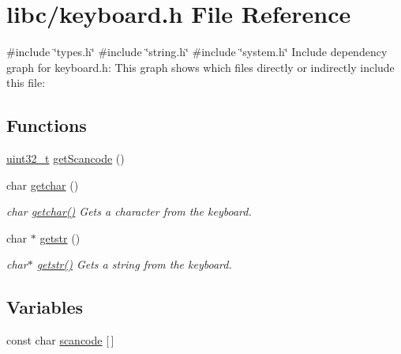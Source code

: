 \hypertarget{a00023}{}\section{libc/keyboard.h File Reference}
\label{a00023}
{\ttfamily \#include \char`\"{}types.\+h\char`\"{}}\newline
{\ttfamily \#include \char`\"{}string.\+h\char`\"{}}\newline
{\ttfamily \#include \char`\"{}system.\+h\char`\"{}}\newline
Include dependency graph for keyboard.\+h\+:
This graph shows which files directly or indirectly include this file\+:
\subsection*{Functions}
\begin{DoxyCompactItemize}
\item 
\hyperlink{a00038_a435d1572bf3f880d55459d9805097f62_a435d1572bf3f880d55459d9805097f62}{uint32\+\_\+t} \hyperlink{a00023_ab584031dc93be7f7bda67c862a770fca_ab584031dc93be7f7bda67c862a770fca}{get\+Scancode} ()
\item 
char \hyperlink{a00023_a0979671914792955a7a68461634ff82d_a0979671914792955a7a68461634ff82d}{getchar} ()
\begin{DoxyCompactList}\small\item\em char \hyperlink{a00023_a0979671914792955a7a68461634ff82d_a0979671914792955a7a68461634ff82d}{getchar()} Gets a character from the keyboard. \end{DoxyCompactList}\item 
char $\ast$ \hyperlink{a00023_af63ede2ad39481e059d92df0513f279a_af63ede2ad39481e059d92df0513f279a}{getstr} ()
\begin{DoxyCompactList}\small\item\em char$\ast$ \hyperlink{a00023_af63ede2ad39481e059d92df0513f279a_af63ede2ad39481e059d92df0513f279a}{getstr()} Gets a string from the keyboard. \end{DoxyCompactList}\end{DoxyCompactItemize}
\subsection*{Variables}
\begin{DoxyCompactItemize}
\item 
const char \hyperlink{a00023_a995065aa3ec952b9a46d5be5898260d4_a995065aa3ec952b9a46d5be5898260d4}{scancode} \mbox{[}$\,$\mbox{]}
\end{DoxyCompactItemize}


